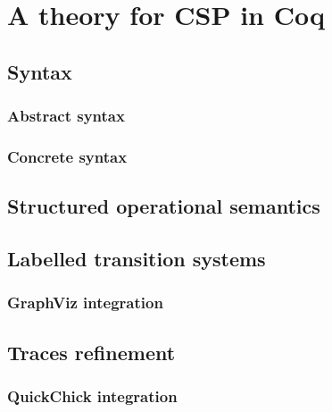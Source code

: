 \chapter{A theory for CSP in Coq}
\label{chapter:csp_coq}

\section{Syntax}

\subsection{Abstract syntax}

\subsection{Concrete syntax}

\section{Structured operational semantics}

\section{Labelled transition systems}

\subsection{GraphViz integration}

\section{Traces refinement}

\subsection{QuickChick integration}
